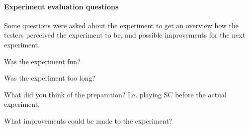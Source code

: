 \paragraph{Experiment evaluation questions}
Some questions were asked about the experiment to get an overview how the testers perceived the
experiment to be, and possible improvements for the next experiment.
\begin{compactitem}
	\item	Was the experiment fun?
	\item Was the experiment too long?
	\item What did you think of the preparation? I.e. playing SC before the actual experiment.
	\item What improvements could be made to the experiment?
\end{compactitem}
